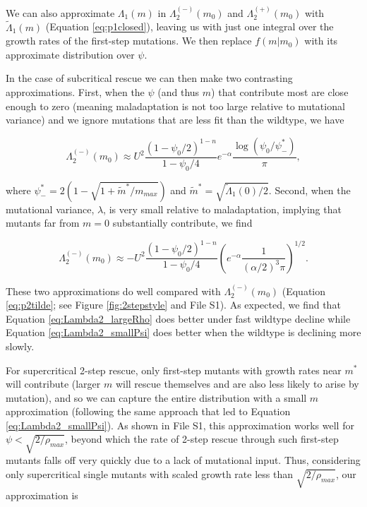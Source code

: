 \documentclass[9pt,twocolumn,twoside,lineno]{gsajnl}
\begin{document}
We can also approximate $\Lambda_1(m)$ in $\Lambda_2^{(-)}(m_0)$ and $\Lambda_2^{(+)}(m_0)$ with $\tilde{\Lambda}_1(m)$ (Equation \ref{eq:p1closed}), leaving us with just one integral over the growth rates of the first-step mutations.
We then replace $f(m|m_0)$ with its approximate distribution over $\psi$.

In the case of subcritical rescue we can then make two contrasting approximations.
First, when the $\psi$ (and thus $m$) that contribute most are close enough to zero (meaning maladaptation is not too large relative to mutational variance) and we ignore mutations that are less fit than the wildtype, we have

\begin{equation}\label{eq:Lambda2_smallPsi}
\Lambda_2^{(-)}(m_0) \approx U^2 \frac{(1-\psi_0/2)^{1-n}}{1-\psi_0/4} e^{-\alpha} \frac{\log(\psi_0 / \psi^*_{-})}{\pi},
\end{equation}

\noindent where $\psi^*_{-} = 2(1-\sqrt{1 + \tilde{m}^*/m_{max}})$ and $\tilde{m}^* = \sqrt{\tilde{\Lambda}_1(0)/2}$.
Second, when the mutational variance, $\lambda$, is very small relative to maladaptation, implying that mutants far from $m=0$ substantially contribute, we find

\begin{equation}\label{eq:Lambda2_largeRho}
\Lambda_2^{(-)}(m_0) \approx -U^2 \frac{(1-\psi_0/2)^{1-n}}{1-\psi_0/4} \left(  e^{-\alpha} \frac{1}{(\alpha/2)^3 \pi} \right)^{1/2}.
\end{equation}

\noindent These two approximations do well compared with $\Lambda_2^{(-)}(m_0)$ (Equation \ref{eq:p2tilde}; see Figure \ref{fig:2stepstyle} and File S1).
As expected, we find that Equation \ref{eq:Lambda2_largeRho} does better under fast wildtype decline while Equation \ref{eq:Lambda2_smallPsi} does better when the wildtype is declining more slowly. 

For supercritical 2-step rescue, only first-step mutants with growth rates near $m^*$ will contribute (larger $m$ will rescue themselves and are also less likely to arise by mutation), and so we can capture the entire distribution with a small $m$ approximation (following the same approach that led to Equation \ref{eq:Lambda2_smallPsi}).
As shown in File S1, this approximation works well for $\psi<\sqrt{2/\rho_{max}}$, beyond which the rate of 2-step rescue through such first-step mutants falls off very quickly due to a lack of mutational input.
Thus, considering only supercritical single mutants with scaled growth rate less than $\sqrt{2/\rho_{max}}$, our approximation is
\end{document}
